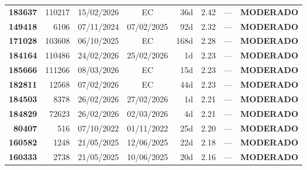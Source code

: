 \documentclass[a4paper,10pt]{article}
\begin{document}
\begin{center}
\begin{longtable}{>{\scriptsize}r>{\scriptsize}r>{\scriptsize}c>{\scriptsize}c>{\scriptsize}r>{\scriptsize}r>{\scriptsize}r>{\scriptsize}l}
\textcolor{anomyellow}{\textbf{183637}} & 110217 & 15/02/2026 & \textcolor{anomorange}{EC} & 36d & \textcolor{anomyellow}{2.42} & --- & \textcolor{anomyellow}{\textbf{MODERADO}} \\

\textcolor{anomyellow}{\textbf{149418}} & 6106 & 07/11/2024 & 07/02/2025 & 92d & \textcolor{anomyellow}{2.32} & --- & \textcolor{anomyellow}{\textbf{MODERADO}} \\

\textcolor{anomyellow}{\textbf{171028}} & 103608 & 06/10/2025 & \textcolor{anomorange}{EC} & 168d & \textcolor{anomyellow}{2.28} & --- & \textcolor{anomyellow}{\textbf{MODERADO}} \\

\textcolor{anomyellow}{\textbf{184164}} & 110486 & 24/02/2026 & 25/02/2026 & 1d & \textcolor{anomyellow}{2.23} & --- & \textcolor{anomyellow}{\textbf{MODERADO}} \\

\textcolor{anomyellow}{\textbf{185666}} & 111266 & 08/03/2026 & \textcolor{anomorange}{EC} & 15d & \textcolor{anomyellow}{2.23} & --- & \textcolor{anomyellow}{\textbf{MODERADO}} \\

\textcolor{anomyellow}{\textbf{182811}} & 12568 & 07/02/2026 & \textcolor{anomorange}{EC} & 44d & \textcolor{anomyellow}{2.23} & --- & \textcolor{anomyellow}{\textbf{MODERADO}} \\

\textcolor{anomyellow}{\textbf{184503}} & 8378 & 26/02/2026 & 27/02/2026 & 1d & \textcolor{anomyellow}{2.21} & --- & \textcolor{anomyellow}{\textbf{MODERADO}} \\

\textcolor{anomyellow}{\textbf{184829}} & 72623 & 26/02/2026 & 02/03/2026 & 4d & \textcolor{anomyellow}{2.21} & --- & \textcolor{anomyellow}{\textbf{MODERADO}} \\

\textcolor{anomyellow}{\textbf{80407}} & 516 & 07/10/2022 & 01/11/2022 & 25d & \textcolor{anomyellow}{2.20} & --- & \textcolor{anomyellow}{\textbf{MODERADO}} \\

\textcolor{anomyellow}{\textbf{160582}} & 1248 & 21/05/2025 & 12/06/2025 & 22d & \textcolor{anomyellow}{2.18} & --- & \textcolor{anomyellow}{\textbf{MODERADO}} \\

\textcolor{anomyellow}{\textbf{160333}} & 2738 & 21/05/2025 & 10/06/2025 & 20d & \textcolor{anomyellow}{2.16} & --- & \textcolor{anomyellow}{\textbf{MODERADO}} \\


\end{longtable}
\end{center}
\end{document}
